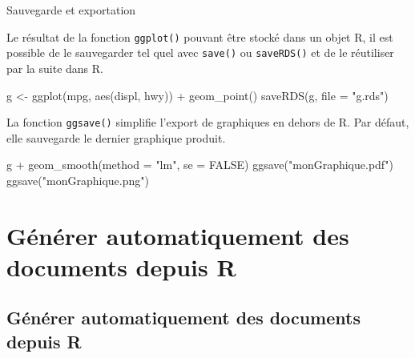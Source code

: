 \documentclass[12pt,handout,ignorenonframetext,]{beamer}
\newenvironment{Shaded}{}{}
\newcommand{\KeywordTok}[1]{\textcolor[rgb]{0.00,0.00,1.00}{#1}}
\newcommand{\DataTypeTok}[1]{#1}
\newcommand{\StringTok}[1]{\textcolor[rgb]{0.00,0.50,0.50}{#1}}
\newcommand{\OtherTok}[1]{\textcolor[rgb]{1.00,0.25,0.00}{#1}}
\newcommand{\OperatorTok}[1]{#1}
\newcommand{\NormalTok}[1]{#1}
\renewenvironment{Shaded}{\begin{snugshade}}{\end{snugshade}}
\begin{document}
\begin{frame}[fragile]{Sauvegarde et exportation}

Le résultat de la fonction \texttt{ggplot()} pouvant être stocké dans un
objet R, il est possible de le sauvegarder tel quel avec \texttt{save()}
ou \texttt{saveRDS()} et de le réutiliser par la suite dans R.

\begin{Shaded}
\begin{Highlighting}[]
\NormalTok{g <-}\StringTok{ }\KeywordTok{ggplot}\NormalTok{(mpg, }\KeywordTok{aes}\NormalTok{(displ, hwy)) }\OperatorTok{+}\StringTok{ }\KeywordTok{geom_point}\NormalTok{()}
\KeywordTok{saveRDS}\NormalTok{(g, }\DataTypeTok{file =} \StringTok{"g.rds"}\NormalTok{)}
\end{Highlighting}
\end{Shaded}

\pause La fonction \texttt{ggsave()} simplifie l'export de graphiques en
dehors de R. Par défaut, elle sauvegarde le dernier graphique produit.

\begin{Shaded}
\begin{Highlighting}[]
\NormalTok{g }\OperatorTok{+}\StringTok{ }\KeywordTok{geom_smooth}\NormalTok{(}\DataTypeTok{method =} \StringTok{"lm"}\NormalTok{, }\DataTypeTok{se =} \OtherTok{FALSE}\NormalTok{)}
\KeywordTok{ggsave}\NormalTok{(}\StringTok{"monGraphique.pdf"}\NormalTok{)}
\KeywordTok{ggsave}\NormalTok{(}\StringTok{"monGraphique.png"}\NormalTok{)}
\end{Highlighting}
\end{Shaded}

\end{frame}

\section{Générer automatiquement des documents depuis
R}\label{generer-automatiquement-des-documents-depuis-r}

\subsection*{Générer automatiquement des documents depuis R}
\end{document}
